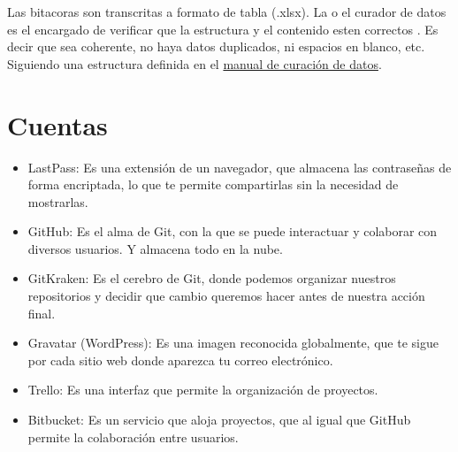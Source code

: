 \documentclass[12pt,letterpaper]{article}
\begin{document}
Las bitacoras son transcritas a formato de tabla (.xlsx). La o el curador de datos es el encargado de
verificar que la estructura y el contenido esten correctos \citep{it_user_2020}. Es decir que sea
coherente, no haya datos duplicados, ni espacios en blanco, etc. Siguiendo una estructura definida
en el \href{https://drive.google.com/drive/folders/1X-EdWtD6sxItwKmCyGpviCt85IvexRxo}{manual de
curación de datos}.

\section*{Cuentas}
\begin{itemize}
\item LastPass: Es una extensión de un navegador, que almacena las contraseñas de forma encriptada,
lo que te permite compartirlas sin la necesidad de mostrarlas.
\item GitHub: Es el alma de Git, con la que se puede interactuar y colaborar con diversos usuarios.
Y almacena todo en la nube.
\item GitKraken: Es el cerebro de Git, donde podemos organizar nuestros repositorios y decidir que
cambio queremos hacer antes de nuestra acción final.
\item Gravatar (WordPress): Es una imagen reconocida globalmente, que te sigue por cada sitio web
donde aparezca tu correo electrónico.
\item Trello: Es una interfaz que permite la organización de proyectos.
\item Bitbucket: Es un servicio que aloja proyectos, que al igual que GitHub permite la colaboración
entre usuarios.
\end{itemize}

 

\end{document}
